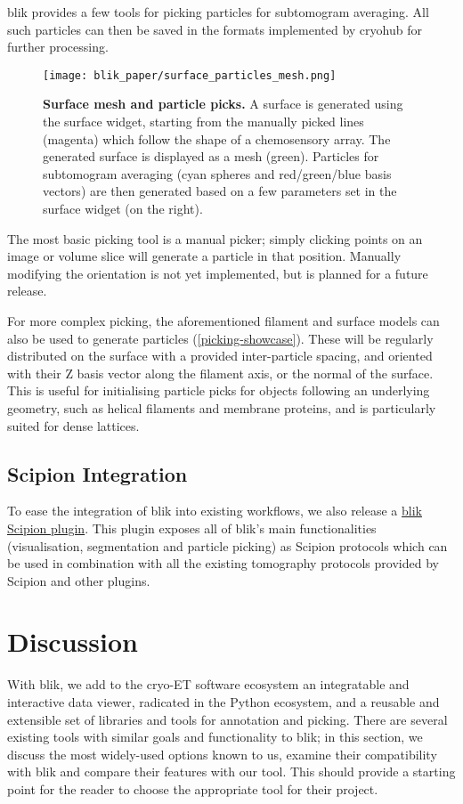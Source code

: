 blik provides a few tools for picking particles for subtomogram averaging. All such particles can then be saved in the formats implemented by cryohub for further processing.

\begin{figure}[!ht]
    \centering
    \texttt{[image: blik\_paper/surface\_particles\_mesh.png]}
    \caption[Surface mesh and particle picks]{\textbf{Surface mesh and particle picks.} A surface is generated using the surface widget, starting from the manually picked lines (magenta) which follow the shape of a chemosensory array. The generated surface is displayed as a mesh (green). Particles for subtomogram averaging (cyan spheres and red/green/blue basis vectors) are then generated based on a few parameters set in the surface widget (on the right).}
    \label{picking-showcase}
\end{figure}

The most basic picking tool is a manual picker; simply clicking points on an image or volume slice will generate a particle in that position. Manually modifying the orientation is not yet implemented, but is planned for a future release.

For more complex picking, the aforementioned filament and surface models can also be used to generate particles (\autoref{picking-showcase}). These will be regularly distributed on the surface with a provided inter-particle spacing, and oriented with their Z basis vector along the filament axis, or the normal of the surface. This is useful for initialising particle picks for objects following an underlying geometry, such as helical filaments and membrane proteins, and is particularly suited for dense lattices.

\subsection{Scipion Integration}\label{scipion-integration}

To ease the integration of blik into existing workflows, we also release a \href{https://github.com/scipion-em/scipion-em-blik}{blik Scipion plugin}. This plugin exposes all of blik's main functionalities (visualisation, segmentation and particle picking) as Scipion protocols which can be used in combination with all the existing tomography protocols provided by Scipion and other plugins.

\section{Discussion}
With blik, we add to the cryo-ET software ecosystem an integratable and interactive data viewer, radicated in the Python ecosystem, and a reusable and extensible set of libraries and tools for annotation and picking. There are several existing tools with similar goals and functionality to blik; in this section, we discuss the most widely-used options known to us, examine their compatibility with blik and compare their features with our tool. This should provide a starting point for the reader to choose the appropriate tool for their project.

